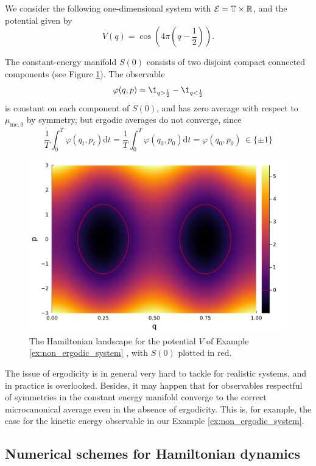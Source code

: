     \begin{example}\label{ex:non_ergodic_system}
        We consider the following one-dimensional system with $\mathcal E= \mathbb T \times \mathbb{R}$, and the potential given by 
        \[V(q)=\cos(4\pi(q-\frac12)).\]
        
        The constant-energy manifold $S(0)$ consists of two disjoint compact connected components (see Figure \ref{fig:non_ergodic_system}). The observable
        \[\varphi(q,p)=\1_{q>\frac12}-\1_{q<\frac12}\]
        is constant on each component of $S(0)$, and has zero average with respect to $\mu_{\mathrm{mc,0}}$ by symmetry, but ergodic averages do not converge, since 
        \[\frac{1}{T} \int_0^T \varphi(q_t,p_t)\mathrm{d}t =  \frac{1}{T}\int_0^T \varphi(q_0,p_0)\mathrm{d}t=\varphi(q_0,p_0)\,\in\{\pm 1\}\]
        \begin{figure}[htbp]
            \begin{center}
              \includegraphics[width=0.7\linewidth]{figures/chapter1/ergodicity.pdf}
              \caption{ \label{fig:non_ergodic_system}
                The Hamiltonian landscape for the potential $V$ of Example \ref{ex:non_ergodic_system} , with $S(0)$ plotted in red.
              }
            \end{center}
          \end{figure}
    \end{example}

    The issue of ergodicity is in general very hard to tackle for realistic systems, and in practice is overlooked.
     Besides, it may happen that for observables respectful of symmetries in the constant energy manifold converge to the correct microcanonical average even in the absence of ergodicity.
     This is, for example, the case for the kinetic energy observable in our Example \ref{ex:non_ergodic_system}.

    \subsection{Numerical schemes for Hamiltonian dynamics}

